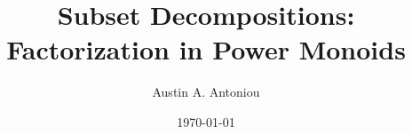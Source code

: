 \documentclass{report}
\title{Subset Decompositions: Factorization in Power Monoids}
\author{Austin A. Antoniou}
\date{\today}
\begin{document}
\maketitle

\tableofcontents










\newpage
\nocite{*}


\end{document}
